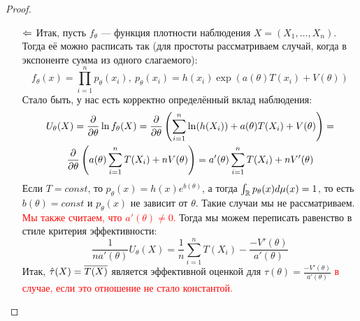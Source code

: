 \begin{proof}~
	\begin{itemize}
		\item[$\Leftarrow$] Итак, пусть $f_\theta$ --- функция плотности наблюдения $X = (X_1, \ldots, X_n)$. Тогда её можно расписать так (для простоты рассматриваем случай, когда в экспоненте сумма из одного слагаемого):
		\[
			f_\theta(x) = \prod_{i = 1}^n p_\theta(x_i),\ p_\theta(x_i) = h(x_i)\exp(a(\theta)T(x_i) + V(\theta))
		\]
		Стало быть, у нас есть корректно определённый вклад наблюдения:
		\begin{multline*}
			U_\theta(X) = \frac{\partial }{\partial \theta} \ln f_\theta(X) = \frac{\partial }{\partial \theta} \left(\sum_{i = 1}^n \ln (h(X_i)) + a(\theta)T(X_i) + V(\theta)\right) =
			\\
			\frac{\partial }{\partial \theta} \left(a(\theta)\sum_{i = 1}^n T(X_i) + nV(\theta)\right) = a'(\theta)\sum_{i = 1}^n T(X_i) + nV'(\theta)
		\end{multline*}
		Если $T = const$, то $p_\theta(x) = h(x)e^{b(\theta)}$, а тогда $\int_{\mathbb{R}} p_\theta(x)d\mu(x) = 1$, то есть $b(\theta) = const$ и $p_\theta(x)$ не зависит от $\theta$. Такие случаи мы не рассматриваем. \textcolor{red}{Мы также считаем, что $a'(\theta) \neq 0$.} Тогда мы можем переписать равенство в стиле критерия эффективности:
		\[
			\frac{1}{na'(\theta)}U_\theta(X) = \frac{1}{n}\sum_{i = 1}^n T(X_i) - \frac{-V'(\theta)}{a'(\theta)}
		\]
		Итак, $\hat{\tau}(X) = \overline{T(X)}$ является эффективной оценкой для $\tau(\theta) = \frac{-V'(\theta)}{a'(\theta)}$ \textcolor{red}{в случае, если это отношение не стало константой.}
		

\end{itemize}
\end{proof}
